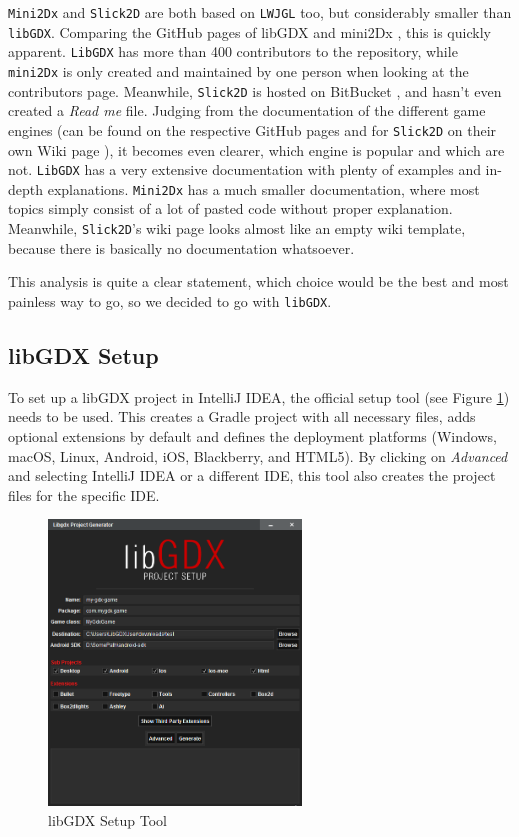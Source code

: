 \documentclass[12p]{article}
\begin{document}
\texttt{Mini2Dx} and \texttt{Slick2D} are both based on \texttt{LWJGL} too, but considerably smaller than \texttt{libGDX}. Comparing the GitHub pages of libGDX \cite{libgDXGitHub} and mini2Dx \cite{mini2DxGitHub}, this is quickly apparent. \texttt{LibGDX} has more than 400 contributors to the repository, while \texttt{mini2Dx} is only created and maintained by one person when looking at the contributors page. Meanwhile, \texttt{Slick2D} is hosted on BitBucket \cite{Slick2DBitBucket}, and hasn't even created a \emph{Read me} file. Judging from the documentation of the different game engines (can be found on the respective GitHub pages and for \texttt{Slick2D} on their own Wiki page \cite{Slick2DWiki}), it becomes even clearer, which engine is popular and which are not. \texttt{LibGDX} has a very extensive documentation with plenty of examples and in-depth explanations. \texttt{Mini2Dx} has a much smaller documentation, where most topics simply consist of a lot of pasted code without proper explanation. Meanwhile, \texttt{Slick2D}'s wiki page looks almost like an empty wiki template, because there is basically no documentation whatsoever.

This analysis is quite a clear statement, which choice would be the best and most painless way to go, so we decided to go with \texttt{libGDX}.


\subsection{libGDX Setup} \label{DocSetup}

To set up a libGDX project in IntelliJ IDEA, the official setup tool (see Figure \ref{fig:LibGDXSetupScreenshot}) needs to be used. This creates a Gradle project with all necessary files, adds optional extensions by default and defines the deployment platforms (Windows, macOS, Linux, Android, iOS, Blackberry, and HTML5). By clicking on \emph{Advanced} and selecting IntelliJ IDEA or a different IDE, this tool also creates the project files for the specific IDE.

\begin{figure}[ht]
  \centering
  \includegraphics[width=0.6\textwidth]{libGDX_setup.png}
  \caption{libGDX Setup Tool}
  \label{fig:LibGDXSetupScreenshot}
\end{figure}
\end{document}
